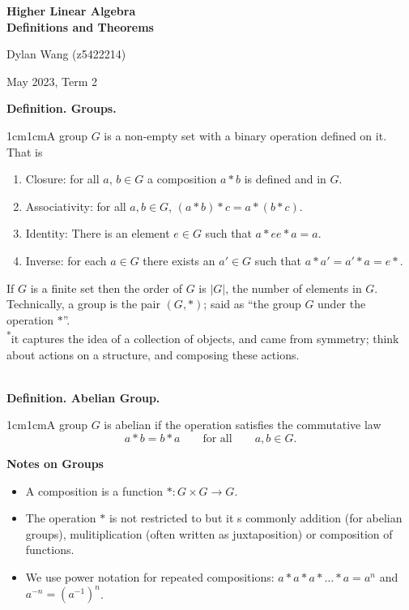 \documentclass{article}
\newcommand{\definition}[2]{\textbf{Definition. #1.}\begin{adjustwidth}{1cm}{1cm}#2\end{adjustwidth}}
\begin{document}
\begin{titlepage}
    \centering
    \vspace*{\fill}

    \vspace*{0.5cm}

    \huge\bfseries
    Higher Linear Algebra\\Definitions and Theorems

    \vspace*{2cm}

    \large Dylan Wang (z5422214)

    \vspace*{2cm}

    \large May 2023, Term 2

    \vspace*{\fill}
\end{titlepage}
\newpage
\definition{Groups}{A group $G$ is a non-empty set with a binary operation defined on it. That is \begin{enumerate} \item Closure: for all $a$, $b \in G$ a composition $a * b$ is defined and in $G$.\item Associativity: for all $a,b \in G$, $(a*b)*c=a*(b*c)$. \item Identity: There is an element $e \in G$ such that $a * e e * a = a$. \item Inverse: for each $a \in G$ there exists an $a' \in G$ such that $a * a' = a' * a = e*.$ \end{enumerate}If $G$ is a finite set then the order of $G$ is $|G|$, the number of elements in $G$. Technically, a group is the pair $(G, *)$; said as ``the group $G$ under the operation $*$''.\\[1\baselineskip]\textsuperscript{*}it captures the idea of a collection of objects, and came from symmetry; think about actions on a structure, and composing these actions.}~\\
\definition{Abelian Group}{A group $G$ is abelian if the operation satisfies the commutative law \[a * b = b * a \qquad \text{for all} \qquad a,b \in G.\]}
\textbf{Notes on Groups}\begin{itemize}
  \item A composition is a function $*: G \times G \rightarrow G$.
  \item The operation $*$ is not restricted to but it s commonly addition (for abelian groups), mulitiplication (often written as juxtaposition) or composition of functions.
  \item We use power notation for repeated compositions: $a * a * a * \ldots * a = a^n$ and $a^{-n} = (a^{-1})^n$.
\end{itemize}
\end{document}
